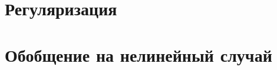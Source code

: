 \documentclass{beamer}
\begin{document}
	
	\section{Регуляризация}
	
	
	\begin{frame}
		\frametitle{}
		
	\end{frame}


	\section[Нелинейный случай]{Обобщение на нелинейный случай}
	
	
	\begin{frame}
		\frametitle{}
		
	\end{frame}
	
\end{document}
